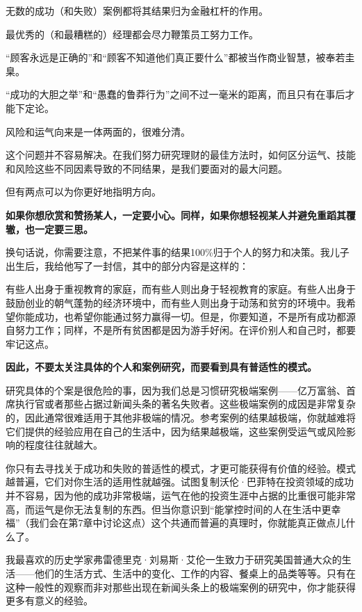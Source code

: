 无数的成功（和失败）案例都将其结果归为金融杠杆的作用。

最优秀的（和最糟糕的）经理都会尽力鞭策员工努力工作。

“顾客永远是正确的”和“顾客不知道他们真正要什么”都被当作商业智慧，被奉若圭臬。

“成功的大胆之举”和“愚蠢的鲁莽行为”之间不过一毫米的距离，而且只有在事后才能下定论。

风险和运气向来是一体两面的，很难分清。

这个问题并不容易解决。在我们努力研究理财的最佳方法时，如何区分运气、技能和风险这些不同因素导致的不同结果，是我们要面对的最大问题。

但有两点可以为你更好地指明方向。

\textbf{如果你想欣赏和赞扬某人，一定要小心。同样，如果你想轻视某人并避免重蹈其覆辙，也一定要三思。}

换句话说，你需要注意，不把某件事的结果100\%归于个人的努力和决策。我儿子出生后，我给他写了一封信，其中的部分内容是这样的：

{\kaishu

有些人出身于重视教育的家庭，而有些人则出身于轻视教育的家庭。有些人出身于鼓励创业的朝气蓬勃的经济环境中，而有些人则出身于动荡和贫穷的环境中。我希望你能成功，也希望你能通过努力赢得一切。但是，你要知道，不是所有成功都源自努力工作；同样，不是所有贫困都是因为游手好闲。在评价别人和自己时，都要牢记这点。

}

\textbf{因此，不要太关注具体的个人和案例研究，而要看到具有普适性的模式。}

研究具体的个案是很危险的事，因为我们总是习惯研究极端案例——亿万富翁、首席执行官或者那些占据过新闻头条的著名失败者。这些极端案例的成因是非常复杂的，因此通常很难适用于其他非极端的情况。参考案例的结果越极端，你就越难将它们提供的经验应用在自己的生活中，因为结果越极端，这些案例受运气或风险影响的程度往往就越大。

你只有去寻找关于成功和失败的普适性的模式，才更可能获得有价值的经验。模式越普遍，它们对你生活的适用性就越强。试图复制沃伦·巴菲特在投资领域的成功并不容易，因为他的成功非常极端，运气在他的投资生涯中占据的比重很可能非常高，而运气是你无法复制的东西。但当你意识到“能掌控时间的人在生活中更幸福”（我们会在第7章中讨论这点）这个共通而普遍的真理时，你就能真正做点儿什么了。

我最喜欢的历史学家弗雷德里克·刘易斯·艾伦一生致力于研究美国普通大众的生活——他们的生活方式、生活中的变化、工作的内容、餐桌上的品类等等。只有在这种一般性的观察而非对那些出现在新闻头条上的极端案例的研究中，你才能获得更多有意义的经验。

